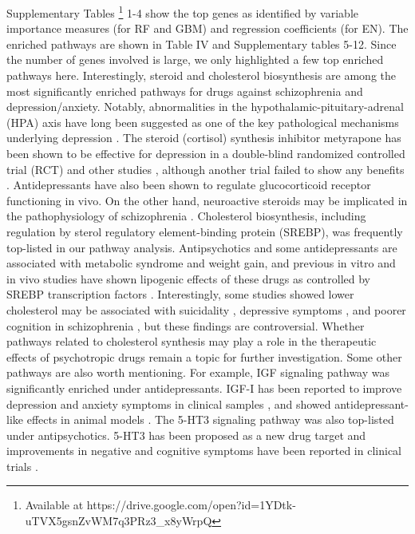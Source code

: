     Supplementary Tables \footnote{Available at https://drive.google.com/open?id=1YDtk-uTVX5gsnZvWM7q3PRz3\_x8yWrpQ} 1-4 show the top genes as identified by variable importance measures (for RF and GBM) and regression coefficients (for EN). The enriched pathways are shown in Table IV and Supplementary tables 5-12. Since the number of genes involved is large, we only highlighted a few top enriched pathways here. Interestingly, steroid and cholesterol biosynthesis are among the most significantly enriched pathways for drugs against schizophrenia and depression/anxiety. Notably, abnormalities in the hypothalamic-pituitary-adrenal (HPA) axis have long been suggested as one of the key pathological mechanisms underlying depression \cite{varghese2001hypothalamic}. The steroid (cortisol) synthesis inhibitor metyrapone has been shown to be effective for depression in a double-blind randomized controlled trial (RCT) \cite{jahn2004metyrapone} and other studies \cite{maia2012phenylpiperazine}, although another trial failed to show any benefits \cite{mcallister2016antidepressant}. Antidepressants have also been shown to regulate glucocorticoid receptor functioning in vivo. On the other hand, neuroactive steroids may be implicated in the pathophysiology of schizophrenia \cite{shulman2005neuroactive}. Cholesterol biosynthesis, including regulation by sterol regulatory element-binding protein (SREBP), was frequently top-listed in our pathway analysis. Antipsychotics and some antidepressants are associated with metabolic syndrome and weight gain, and previous in vitro and in vivo studies have shown lipogenic effects of these drugs as controlled by SREBP transcription factors \cite{raeder2006srebp,ferno2011lipogenic}. Interestingly, some studies showed lower cholesterol may be associated with suicidality \cite{da2014potential}, depressive symptoms \cite{persons2016longitudinal,you2013relationship}, and poorer cognition in schizophrenia \cite{krakowski2011cholesterol}, but these findings are controversial. Whether pathways related to cholesterol synthesis may play a role in the therapeutic effects of psychotropic drugs remain a topic for further investigation. Some other pathways are also worth mentioning. For example, IGF signaling pathway was significantly enriched under antidepressants. IGF-I has been reported to improve depression and anxiety symptoms in clinical samples \cite{thompson1998effects}, and showed antidepressant-like effects in animal models \cite{burgdorf2016insulin,grunbaum2008relationship}. The 5-HT3 signaling pathway was also top-listed under antipsychotics. 5-HT3 has been proposed as a new drug target and improvements in negative and cognitive symptoms have been reported in clinical trials \cite{ellenbroek2015can}.

